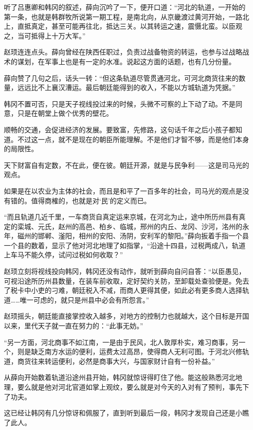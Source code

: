 听了吕惠卿和韩冈的叙述，薛向沉吟了一下，便开口道：“河北的轨道，一开始的第一条，也就是韩群牧所说第一期工程，是南北向，从京畿渡过黄河开始，一路北上，直抵真定，甚至可能再往北，抵达三关。以其转运之速，震慑北蛮。以臣观之，当可抵得上十万大军。”

赵顼连连点头。薛向曾经在陕西任职过，负责过战备物资的转运，也参与过战略战术的谋划，在军事上也是有一定的水准。说起这方面的话题，也有几分份量。

薛向赞了几句之后，话头一转：“但这条轨道尽管贯通河北，可河北商货往来的数量，远远比不上襄汉漕运。最后朝廷能得到的收入，不能以方城轨道为凭据。”

韩冈不置可否，只是天子视线投过来的时候，头微不可察的上下动了动。不是同意，只是在朝堂上做个优秀的壁花。

顺畅的交通，会促进经济的发展。要致富，先修路，这句话千年之后小孩子都知道。不过这一点，就不是现在的朝臣所能理解。不是他们才智不够，而是他们本身的局限性。

天下财富自有定数，不在此，便在彼。朝廷开源，就是与民争利——这是司马光的观点。

如果是在以农业为主体的社会，而且是和平了一百多年的社会，司马光的观点是没有错的。值得商榷的，也就是对‘民’的定义而已。

“而且轨道几近千里，一车商货自真定运来京城，在河北为止，途中所历州县有真定的栾城、元氏，赵州的高邑、柏乡、临城，邢州的内丘、龙冈、沙河，洺州的永年，磁州的邯郸、滏阳，相州的安阳、汤阴，安利军的黎阳。”薛向扳着手指一个县一个县的数着，显示了他对河北地理了如指掌，“沿途十四县，过税两成八，轨道上车马不能久停，试问过税如何收取？”

赵顼立刻将视线投向韩冈，韩冈还没有动作，就听到薛向自问自答：“以臣愚见，可视沿途所历州县数量，在装车前收取，定好契约关防，至卸载处查验便是。免去了税卡中小吏的刁难，朝廷税入不减，而商人更得其便，如此必有更多商人选择轨道……唯一可虑的，就只是州县中必会有所怨言。”

赵顼摇头，朝廷能直接掌控收入越多，对地方的控制力也就越大，这个目标是开国以来，里代天子就一直在努力的：“此事无妨。”

“另一方面，河北商事不如江南，一是由于民风，北人敦厚朴实，难习商事，另一个，则是缺乏南方水运的便利，运费太过高昂，使得商人无利可图。于河北兴修轨道，商货往来转运便利，必然是商事大兴，与国家财计自有一份补益。”

从薛向开始数着轨道沿途州县开始，韩冈就惊讶得盯住了他。能这般熟悉河北地理，要么就是他对河北官道如掌上观纹，要么就是对今天的入对有了预判，事先下了功夫。

这已经让韩冈有几分惊讶和佩服了，直到听到最后一段，韩冈才发现自己还是小瞧了此人。

